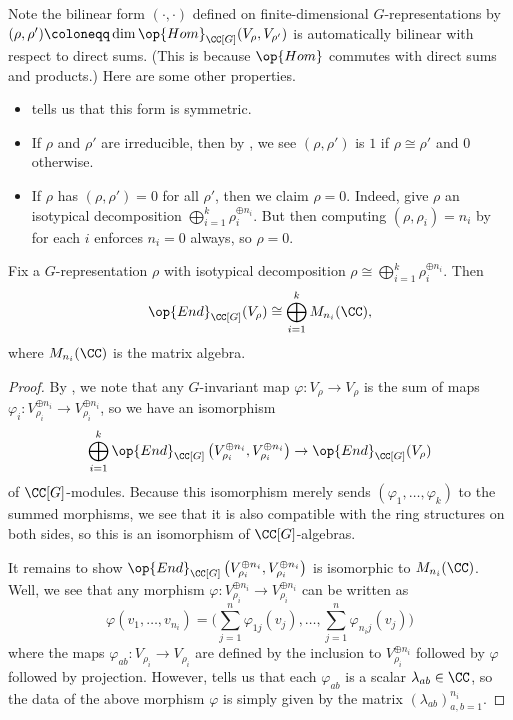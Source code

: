 \documentclass{article}
\begin{document}
\begin{remark}
	Note the bilinear form $(\cdot,\cdot)$ defined on finite-dimensional $G$-representations by $(\rho,\rho')\coloneqq\dim\op{Hom}_{\CC[G]}(V_\rho,V_{\rho'})$ is automatically bilinear with respect to direct sums. (This is because $\op{Hom}$ commutes with direct sums and products.) Here are some other properties.
	\begin{itemize}
		\item {} tells us that this form is symmetric.
		\item If $\rho$ and $\rho'$ are irreducible, then by , we see $(\rho,\rho')$ is $1$ if $\rho\cong\rho'$ and $0$ otherwise.
		\item If $\rho$ has $(\rho,\rho')=0$ for all $\rho'$, then we claim $\rho=0$. Indeed, give $\rho$ an isotypical decomposition $\bigoplus_{i=1}^k\rho_i^{\oplus n_i}$. But then computing $(\rho,\rho_i)=n_i$ by  for each $i$ enforces $n_i=0$ always, so $\rho=0$.
	\end{itemize}
\end{remark}
\begin{corollary}
	Fix a $G$-representation $\rho$ with isotypical decomposition $\rho\cong\bigoplus_{i=1}^k\rho_i^{\oplus n_i}$. Then
	\[\op{End}_{\CC[G]}(V_\rho)\cong\bigoplus_{i=1}^kM_{n_i}(\CC),\]
	where $M_{n_i}(\CC)$ is the matrix algebra.
\end{corollary}
\begin{proof}
	By , we note that any $G$-invariant map $\varphi\colon V_\rho\to V_\rho$ is the sum of maps $\varphi_i\colon V_{\rho_i}^{\oplus n_i}\to V_{\rho_i}^{\oplus n_i}$, so we have an isomorphism
	\[\bigoplus_{i=1}^k\op{End}_{\CC[G]}\left(V_{\rho_i}^{\oplus n_i},V_{\rho_i}^{\oplus n_i}\right)\to\op{End}_{\CC[G]}(V_\rho)\]
	of $\CC[G]$-modules. Because this isomorphism merely sends $(\varphi_1,\ldots,\varphi_k)$ to the summed morphisms, we see that it is also compatible with the ring structures on both sides, so this is an isomorphism of $\CC[G]$-algebras.

	It remains to show $\op{End}_{\CC[G]}\left(V_{\rho_i}^{\oplus n_i},V_{\rho_i}^{\oplus n_i}\right)$ is isomorphic to $M_{n_i}(\CC)$. Well, we see that any morphism $\varphi\colon V_{\rho_i}^{\oplus n_i}\to V_{\rho_i}^{\oplus n_i}$ can be written as
	\[\varphi(v_1,\ldots,v_{n_i})=\Bigg(\sum_{j=1}^n\varphi_{1j}(v_j),\ldots,\sum_{j=1}^n\varphi_{n_ij}(v_j)\Bigg)\]
	where the maps $\varphi_{ab}\colon V_{\rho_i}\to V_{\rho_i}$ are defined by the inclusion to $V_{\rho_i}^{\oplus n_i}$ followed by $\varphi$ followed by projection. However,  tells us that each $\varphi_{ab}$ is a scalar $\lambda_{ab}\in\CC$, so the data of the above morphism $\varphi$ is simply given by the matrix $(\lambda_{ab})_{a,b=1}^{n_i}$.
\end{proof}
\end{document}
